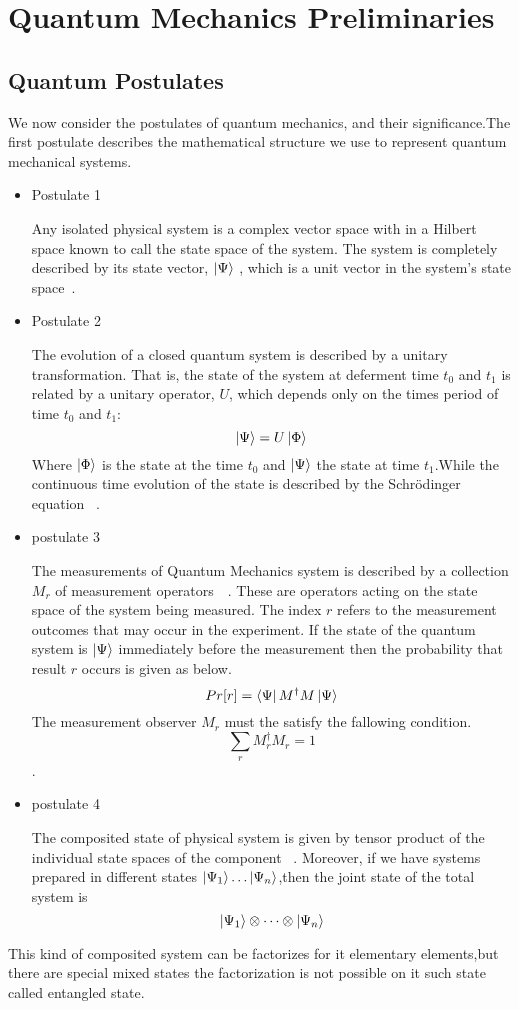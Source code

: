 \section{ Quantum Mechanics Preliminaries }
\subsection{Quantum Postulates}


We now consider the postulates of quantum mechanics, and their significance.The first postulate describes the mathematical structure we use to represent quantum mechanical systems.
\begin{itemize}
\item {Postulate 1}

Any isolated physical system is a complex vector space with in a Hilbert space known to call the state space of the system. The system is completely described by its state vector, $\ket{\Psi}$ , which is a unit vector in the system’s state space~\cite{book:17312}.
\item{Postulate 2}

The evolution of a closed quantum system is described by a unitary transformation. That is, the state of the system at deferment time $t_0$ and $t_1$ is related  by a unitary operator, $U$, which depends only on the times period of time $t_0$ and $t_1$:
$$\ket{\Psi}=U\ket{\Phi}$$
Where $\ket{\Phi}$ is the state at the time $t_0$ and $\ket{\Psi}$ the state at time $t_1$.While the continuous time evolution  of the state is described by the Schrödinger equation ~\cite{book:17312}.
\item{postulate 3}

The measurements of Quantum Mechanics system  is described by a collection ${M_r }$ of measurement operators~\citep{book:17312}~. These are operators acting on the state space of the system being
measured. The index $r $ refers to the measurement outcomes that may occur in the experiment. If the state of the quantum system is $\ket{\Psi}$ immediately before the measurement then the probability that result $r$ occurs is given as below.
$$Pr[r]=\bra{\Psi}M^{\dagger}  M\ket{\Psi}$$ 
The measurement observer ${M_r }$ must the satisfy the fallowing condition.
$$\sum_r M_{r}^{\dagger} M_r=1$$.


\item{postulate 4}

The composited state of physical system is given by  tensor product of the individual state spaces of the component~\citep{book:889079} . Moreover, if we have systems prepared  in different  states $\ket{\Psi_1} \dots \ket{\Psi_n}$,then the joint state of the total system is
$$\ket{\Psi_1}\otimes\dots \otimes\ket{\Psi_n}$$
\end{itemize}
This kind of composited system can be factorizes for it elementary elements,but there are special mixed states the factorization is not possible  on it such state called entangled state.
